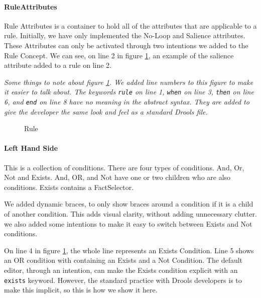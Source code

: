 \paragraph{RuleAttributes} Rule Attributes is a container to hold all of the attributes that are applicable to a rule.
Initially, we have only implemented the No-Loop and Salience attributes.
These Attributes can only be activated through two intentions we added to the Rule Concept.
We can see, on line 2 in figure \ref{fig:Rule}, an example of the salience attribute added to a rule on line 2.

\emph{Some things to note about figure \ref{fig:Rule}.  
We added line numbers to this figure to make it easier to talk about. 
The keywords \texttt{rule} on line 1, \texttt{when} on line 3, \texttt{then} on line 6, and \texttt{end} on line 8 have no meaning in the abstract syntax.
They are added to give the developer the same look and feel as a standard Drools file.}

\begin{figure}[h]
    \centering
    \caption{Rule}
    \label{fig:Rule}
\end{figure}

\paragraph{Left Hand Side} This is a collection of conditions.  
There are four types of conditions. And, Or, Not and Exists.
And, OR, and Not have one or two children who are also conditions.
Exists contains a FactSelector.

We added dynamic braces, to only show braces around a condition if it is a child of another condition.
This adds visual clarity, without adding unnecessary clutter.
we also added some intentions to make it easy to switch between Exists and Not conditions.

On line 4 in figure \ref{fig:Rule}, the whole line represents an Exists Condition.
Line 5 shows an OR condition with containing an Exists and a Not Condition.
The default editor, through an intention, can make the Exists condition explicit with an \texttt{exists} keyword.
However, the standard practice with Drools developers is to make this implicit, so this is how we show it here.

